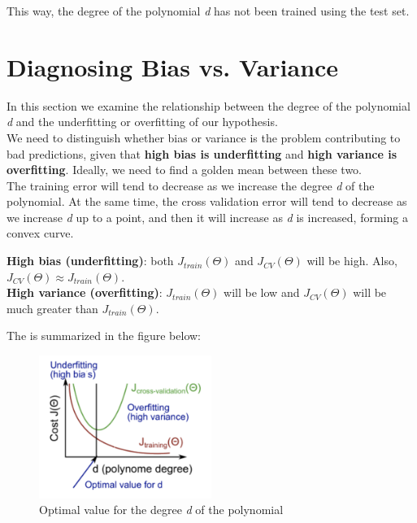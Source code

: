 This way, the degree of the polynomial \textit{d} has not been trained using the test set.

\section{Diagnosing Bias vs. Variance}

In this section we examine the relationship between the degree of the polynomial \textit{d} and the underfitting or overfitting of our hypothesis.\\

We need to distinguish whether bias or variance is the problem contributing to bad predictions, given that \textbf{high bias is underfitting} and \textbf{high variance is overfitting}. Ideally, we need to find a golden mean between these two.\\

The training error will tend to decrease as we increase the degree \textit{d} of the polynomial. At the same time, the cross validation error will tend to decrease as we increase \textit{d} up to a point, and then it will increase as \textit{d} is increased, forming a convex curve.\\

\begin{tcolorbox}[width=\textwidth,colback={white},colbacktitle=white]
\textbf{High bias (underfitting)}: both $ J_{train}(\Theta) $ and $ J_{CV}(\Theta) $ will be high. Also, $ J_{CV}(\Theta) \approx J_{train}(\Theta) $.\\

\textbf{High variance (overfitting)}: $ J_{train}(\Theta) $ will be low and $ J_{CV}(\Theta)$ will be much greater than $ J_{train}(\Theta) $.
\end{tcolorbox}

The is summarized in the figure below:\\

\begin{figure}[h!]
	\centering
	\includegraphics[width=0.5\textwidth]{fig/hv_hb}
	\caption{Optimal value for the degree \textit{d} of the polynomial}
\end{figure}

